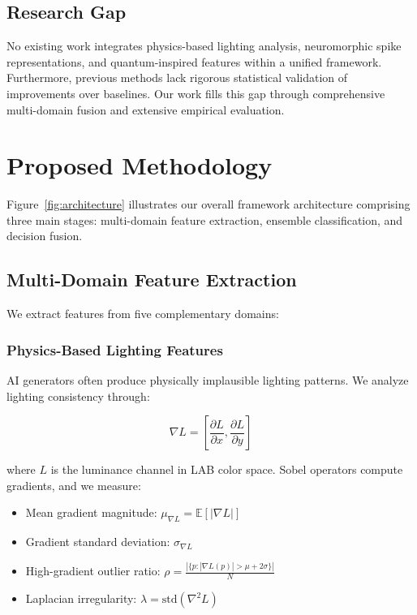 \documentclass[runningheads]{llncs}
\begin{document}
\subsection{Research Gap}

No existing work integrates physics-based lighting analysis, neuromorphic spike representations, and quantum-inspired features within a unified framework. Furthermore, previous methods lack rigorous statistical validation of improvements over baselines. Our work fills this gap through comprehensive multi-domain fusion and extensive empirical evaluation.

\section{Proposed Methodology}
\label{sec:methodology}

Figure~\ref{fig:architecture} illustrates our overall framework architecture comprising three main stages: multi-domain feature extraction, ensemble classification, and decision fusion.

\subsection{Multi-Domain Feature Extraction}

We extract features from five complementary domains:

\subsubsection{Physics-Based Lighting Features}

AI generators often produce physically implausible lighting patterns. We analyze lighting consistency through:

\begin{equation}
    \nabla L = \left[\frac{\partial L}{\partial x}, \frac{\partial L}{\partial y}\right]
\end{equation}

where $L$ is the luminance channel in LAB color space. Sobel operators compute gradients, and we measure:

\begin{itemize}
    \item Mean gradient magnitude: $\mu_{\nabla L} = \mathbb{E}[|\nabla L|]$
    \item Gradient standard deviation: $\sigma_{\nabla L}$
    \item High-gradient outlier ratio: $\rho = \frac{|\{p : |\nabla L(p)| > \mu + 2\sigma\}|}{N}$
    \item Laplacian irregularity: $\lambda = \text{std}(\nabla^2 L)$
\end{itemize}
\end{document}
